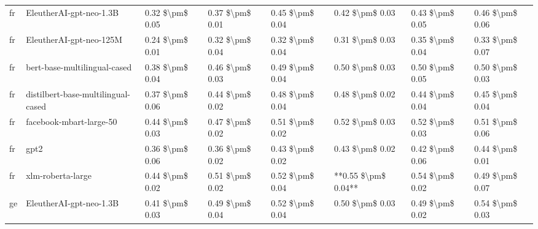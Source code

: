 \begin{tabular}{llllllll}
      fr &            EleutherAI-gpt-neo-1.3B & 0.32 \$\textbackslash pm\$ 0.05 &           0.37 \$\textbackslash pm\$ 0.01 &       0.45 \$\textbackslash pm\$ 0.04 &        0.42 \$\textbackslash pm\$ 0.03 &                         0.43 \$\textbackslash pm\$ 0.05 &     0.46 \$\textbackslash pm\$ 0.06 \\
      fr &            EleutherAI-gpt-neo-125M & 0.24 \$\textbackslash pm\$ 0.01 &           0.32 \$\textbackslash pm\$ 0.04 &       0.32 \$\textbackslash pm\$ 0.04 &        0.31 \$\textbackslash pm\$ 0.03 &                         0.35 \$\textbackslash pm\$ 0.04 &     0.33 \$\textbackslash pm\$ 0.07 \\
      fr &       bert-base-multilingual-cased & 0.38 \$\textbackslash pm\$ 0.04 &           0.46 \$\textbackslash pm\$ 0.03 &       0.49 \$\textbackslash pm\$ 0.04 &        0.50 \$\textbackslash pm\$ 0.03 &                         0.50 \$\textbackslash pm\$ 0.05 &     0.50 \$\textbackslash pm\$ 0.03 \\
      fr & distilbert-base-multilingual-cased & 0.37 \$\textbackslash pm\$ 0.06 &           0.44 \$\textbackslash pm\$ 0.02 &       0.48 \$\textbackslash pm\$ 0.04 &        0.48 \$\textbackslash pm\$ 0.02 &                         0.44 \$\textbackslash pm\$ 0.04 &     0.45 \$\textbackslash pm\$ 0.04 \\
      fr &            facebook-mbart-large-50 & 0.44 \$\textbackslash pm\$ 0.03 &           0.47 \$\textbackslash pm\$ 0.02 &       0.51 \$\textbackslash pm\$ 0.02 &        0.52 \$\textbackslash pm\$ 0.03 &                         0.52 \$\textbackslash pm\$ 0.03 &     0.51 \$\textbackslash pm\$ 0.06 \\
      fr &                               gpt2 & 0.36 \$\textbackslash pm\$ 0.06 &           0.36 \$\textbackslash pm\$ 0.02 &       0.43 \$\textbackslash pm\$ 0.02 &        0.43 \$\textbackslash pm\$ 0.02 &                         0.42 \$\textbackslash pm\$ 0.06 &     0.44 \$\textbackslash pm\$ 0.01 \\
      fr &                  xlm-roberta-large & 0.44 \$\textbackslash pm\$ 0.02 &           0.51 \$\textbackslash pm\$ 0.02 &       0.52 \$\textbackslash pm\$ 0.04 &    **0.55 \$\textbackslash pm\$ 0.04** &                         0.54 \$\textbackslash pm\$ 0.02 &     0.49 \$\textbackslash pm\$ 0.07 \\
      ge &            EleutherAI-gpt-neo-1.3B & 0.41 \$\textbackslash pm\$ 0.03 &           0.49 \$\textbackslash pm\$ 0.04 &       0.52 \$\textbackslash pm\$ 0.04 &        0.50 \$\textbackslash pm\$ 0.03 &                         0.49 \$\textbackslash pm\$ 0.02 &     0.54 \$\textbackslash pm\$ 0.03 \\

\end{tabular}
